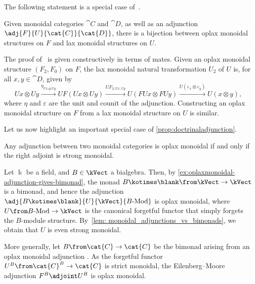 The following statement is a special case of~\cite[Theorem~1.2]{kelly74:doctr}.

\begin{proposition}\label{prop:doctrinaladjunction}
  Given monoidal categories \(\cat{C}\) and \(\cat{D}\),
  as well as an adjunction \(\adj{F}{U}{\cat{C}}{\cat{D}}\),
  there is a bijection between oplax monoidal structures on \(F\)
  and lax monoidal structures on \(U\).
\end{proposition}

The proof of~\cite[Theorem~1.2]{kelly74:doctr} is given constructively in terms of mates.
Given an oplax monoidal structure \((F_2, F_0)\) on \(F\),
the lax monoidal natural transformation \(U_2\) of \(U\) is,
for all \(x,y \in \cat{D}\),
given by
\[
  Ux \otimes Uy
  \xrightarrow{\eta_{Ux \otimes Uy}} UF(Ux \otimes Uy)
  \xrightarrow{UF_{2;Ux,Uy}} U(FUx \otimes FUy)
  \xrightarrow{U(\varepsilon_x \otimes \varepsilon_{y})} U(x \otimes y),
\]
where \(\eta\) and \(\varepsilon\) are the unit and counit of the adjunction.
Constructing an oplax monoidal structure on \(F\) from a lax monoidal structure on \(U\) is similar.

\newpage%
Let us now highlight an important special case of \cref{prop:doctrinaladjunction}.

\begin{lemma}\label{lem: monoidal_adjunctions_vs_bimonads}
  Any adjunction between two monoidal categories
  is oplax monoidal if and only if the right adjoint is strong monoidal.
\end{lemma}

\begin{example}
  Let \(\Bbbk\) be a field, and \(B \in \kVect\) a bialgebra.
  Then, by \cref{ex:oplaxmonoidal-adjunction-gives-bimonad},
  the monad \(B \kotimes \blank\from \kVect \to \kVect\) is a bimonad,
  and hence the adjunction \(\adj{B \kotimes \blank}{U}{\kVect}{B\textnormal{-Mod}}\)
  is oplax monoidal, where \(U\from B\textnormal{-Mod} \to \kVect\)
  is the canonical forgetful functor that simply forgets the \(B\)-module structure.
  By~\cref{lem: monoidal_adjunctions_vs_bimonads}, we obtain that \(U\) is even strong monoidal.

  More generally,
  let \(B \from \cat{C} \to \cat{C}\) be
  the bimonad arising from an oplax monoidal adjunction \stdadj.
  As the forgetful functor \(U^B \from \cat{C}^B \to \cat{C}\) is strict monoidal,
  the Eilenberg–Moore adjunction \(F^B \adjoint U^B\) is oplax monoidal.
\end{example}

